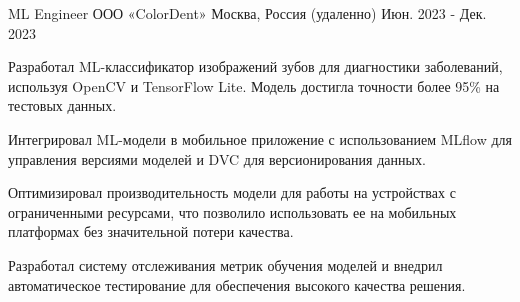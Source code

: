 \begin{cventries}
  \cventry
    {ML Engineer} %
    {ООО «ColorDent»} %
    {Москва, Россия (удаленно)} %
    {Июн. 2023 - Дек. 2023} %
    {
      \begin{cvitems} %
        \item {Разработал ML-классификатор изображений зубов для диагностики заболеваний, используя OpenCV и TensorFlow Lite. Модель достигла точности более 95\% на тестовых данных.}
        \item {Интегрировал ML-модели в мобильное приложение с использованием MLflow для управления версиями моделей и DVC для версионирования данных.}
        \item {Оптимизировал производительность модели для работы на устройствах с ограниченными ресурсами, что позволило использовать ее на мобильных платформах без значительной потери качества.}
        \item {Разработал систему отслеживания метрик обучения моделей и внедрил автоматическое тестирование для обеспечения высокого качества решения.}
      \end{cvitems}
    }

\end{cventries}


